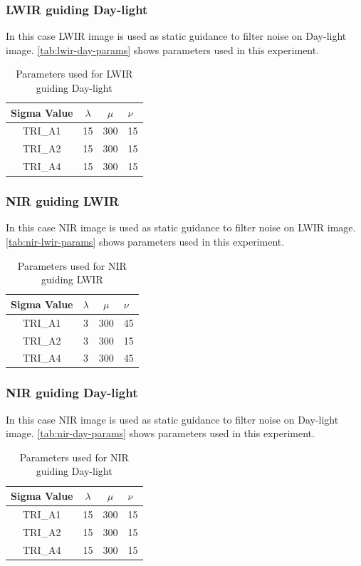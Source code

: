 \documentclass[10pt,twocolumn,letterpaper]{article}
\begin{document}
\subsubsection{LWIR guiding Day-light}
In this case LWIR image is used as static guidance to filter noise on Day-light image. \autoref{tab:lwir-day-params} shows parameters used in this experiment.
\begin{table}[!ht]
	\centering
	\caption{Parameters used for LWIR guiding Day-light}
	\label{tab:lwir-day-params}
	\begin{tabular}{@{}cccl@{}}
		\toprule
		\bfseries Sigma Value & \(\lambda\) & \(\mu\) & \(\nu\) \\ \midrule
		TRI\_A1               & 15        	& 300	  & 15       \\
		TRI\_A2               & 15        	& 300	  & 15       \\
		TRI\_A4               & 15        	& 300	  & 15       \\ \bottomrule
	\end{tabular}
\end{table}
\subsubsection{NIR guiding LWIR}
In this case NIR image is used as static guidance to filter noise on LWIR image. \autoref{tab:nir-lwir-params} shows parameters used in this experiment.
\begin{table}[!ht]
	\centering
	\caption{Parameters used for NIR guiding LWIR}
	\label{tab:nir-lwir-params}
	\begin{tabular}{@{}cccl@{}}
		\toprule
		\bfseries Sigma Value & \(\lambda\) & \(\mu\) & \(\nu\) \\ \midrule
		TRI\_A1               & 3        	& 300	  & 45       \\
		TRI\_A2               & 3        	& 300	  & 15       \\
		TRI\_A4               & 3        	& 300	  & 45       \\ \bottomrule
	\end{tabular}
\end{table}
\subsubsection{NIR guiding Day-light}
In this case NIR image is used as static guidance to filter noise on Day-light image. \autoref{tab:nir-day-params} shows parameters used in this experiment.
\begin{table}[!ht]
	\centering
	\caption{Parameters used for NIR guiding Day-light}
	\label{tab:nir-day-params}
	\begin{tabular}{@{}cccl@{}}
		\toprule
		\bfseries Sigma Value & \(\lambda\) & \(\mu\) & \(\nu\) \\ \midrule
		TRI\_A1               & 15			& 300	  & 15       \\
		TRI\_A2               & 15			& 300	  & 15        \\
		TRI\_A4               & 15			& 300	  & 15        \\ \bottomrule
	\end{tabular}
\end{table}
\end{document}
